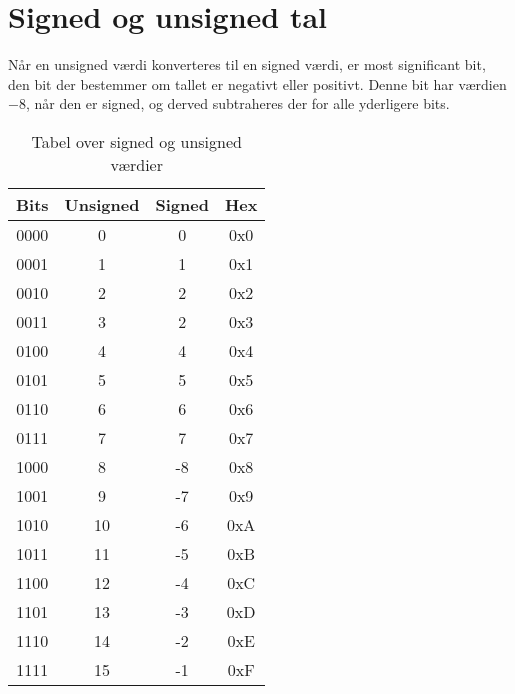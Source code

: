\section{Signed og unsigned tal}
Når en unsigned værdi konverteres til en signed værdi, er most significant bit, den bit der bestemmer om tallet er negativt eller positivt.
Denne bit har værdien $-8$, når den er signed, og derved subtraheres der for alle yderligere bits.
\begin{table}[h]
    \centering
    \begin{tabular}{c|c|c|c}
        Bits&Unsigned&Signed&Hex\\\hline
        0000&0&0&0x0\\
        0001&1&1&0x1\\
        0010&2&2&0x2\\
        0011&3&2&0x3\\
        0100&4&4&0x4\\
        0101&5&5&0x5\\
        0110&6&6&0x6\\
        0111&7&7&0x7\\
        1000&8&-8&0x8\\
        1001&9&-7&0x9\\
        1010&10&-6&0xA\\
        1011&11&-5&0xB\\
        1100&12&-4&0xC\\
        1101&13&-3&0xD\\
        1110&14&-2&0xE\\
        1111&15&-1&0xF\\
    \end{tabular}
    \caption{Tabel over signed og unsigned værdier}
\end{table}
